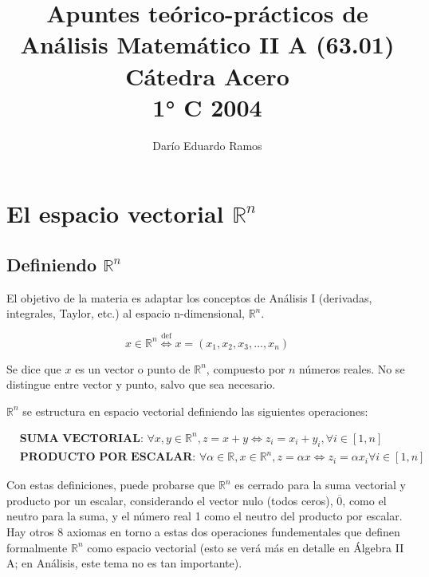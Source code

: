 \documentclass{article}
\title{Apuntes teórico-prácticos de Análisis Matemático II A (63.01) \\ Cátedra Acero \\ 1° C 2004}
\author{Darío Eduardo Ramos}
\renewcommand{\Bbb}{\mathbb}
\begin{document}
\maketitle

\tableofcontents{}


\section{El espacio vectorial \texorpdfstring{$\Bbb R^n$}{Rn}}

\subsection{Definiendo \texorpdfstring{$\Bbb R^n$}{Rn}}

El objetivo de la materia es adaptar los conceptos de Análisis I (derivadas, integrales, Taylor, etc.) al espacio n-dimensional, $\mathbb{R}^n$.

\begin{equation}
x \in \Bbb R^n \overset{\text{def}}{\Longleftrightarrow} x = (x_1, x_2, x_3, \ldots, x_n)
\end{equation}

Se dice que $x$ es un vector o punto de $\Bbb R^n$, compuesto por $n$ números reales. No se distingue entre vector y punto, salvo que sea necesario.

$\Bbb R^n$ se estructura en espacio vectorial definiendo las siguientes operaciones:

\begin{subequations}
\begin{align}
& \textbf{SUMA VECTORIAL: } \forall x, y \in \Bbb R^n, z = x + y \Longleftrightarrow z_i = x_i + y_i, \forall i \in [1, n] \\
& \textbf{PRODUCTO POR ESCALAR: } \forall \alpha \in \Bbb R, x \in \Bbb R^n, z = \alpha x \Longleftrightarrow z_i = \alpha x_i \forall i \in [1, n]
\end{align}
\end{subequations}

Con estas definiciones, puede probarse que $\Bbb R^n$ es cerrado para la suma vectorial y producto por un escalar, considerando el vector nulo (todos ceros), $\overline{0}$, como el neutro para la suma, y el número real 1 como el neutro del producto por escalar. Hay otros 8 axiomas en torno a estas dos operaciones fundementales que definen formalmente $\Bbb R^n$ como espacio vectorial (esto se verá más en detalle en Álgebra II A; en Análisis, este tema no es tan importante).
\end{document}
